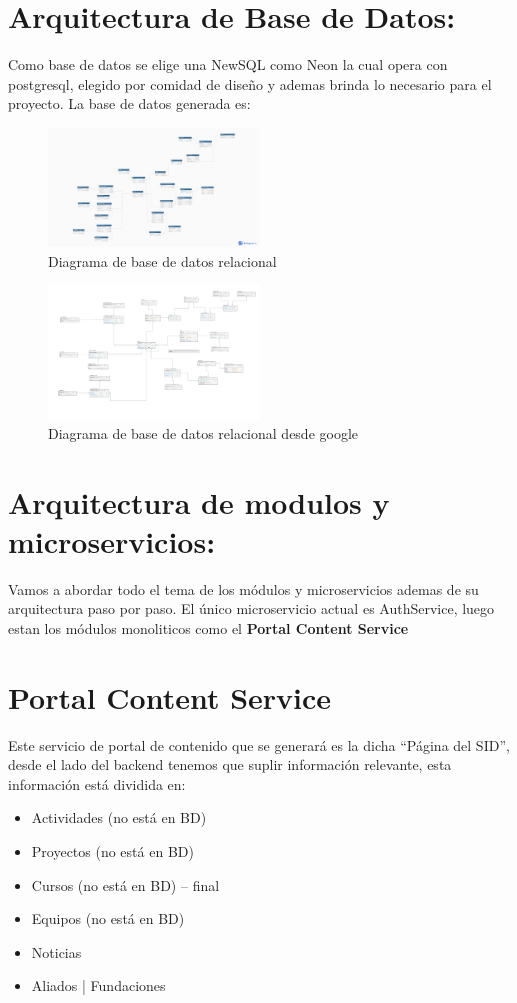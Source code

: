 \documentclass[11pt,a4paper]{article}
\begin{document}
\section{Arquitectura de Base de Datos: }
Como base de datos se elige una NewSQL como Neon la cual opera con postgresql, elegido por comidad de diseño y ademas brinda lo necesario para el proyecto.
La base de datos generada es:
\begin{figure}[H]
	\centering
	\includegraphics[width=0.5\textwidth]{src/SID_Db.pdf}
	\caption{Diagrama de base de datos relacional}
\end{figure}
\begin{figure}[H]
	\centering
	\includegraphics[width=0.5\textwidth]{src/Modelo-pica.png}
	\caption{Diagrama de base de datos relacional desde google}
\end{figure}
\section{Arquitectura de modulos y microservicios: }
Vamos a abordar todo el tema de los m{\'o}dulos y microservicios ademas de su arquitectura paso por paso. 
El único microservicio actual es AuthService, luego estan los m{\'o}dulos monoliticos como el \textbf{Portal Content Service}
\section{Portal Content Service}
Este servicio de portal de contenido que se generará es la dicha ``Página del SID'', desde el lado del backend tenemos que suplir información relevante,
esta información está dividida en:
\begin{itemize}
	\item Actividades (no está en BD)
	\item Proyectos (no está en BD)
	\item Cursos (no está en BD) -- final
	\item Equipos (no está en BD)
	\item Noticias
	\item Aliados | Fundaciones
\end{itemize}
\end{document}

